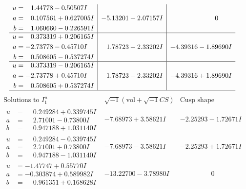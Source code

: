 \documentclass[1p]{elsarticle_modified}
\theoremstyle{definition}
\newcommand{\I}{\sqrt{-1}}
\begin{document}
$$\begin{array}{c|c|c}
\begin{aligned}
u &= \phantom{-}1.44778 - 0.50507 I \\
a &= \phantom{-}0.107561 + 0.627005 I \\
b &= \phantom{-}1.060660 - 0.226591 I\end{aligned}
 & -5.13201 + 2.07157 I & \phantom{-0.000000 } 0 \\ \hline\begin{aligned}
u &= \phantom{-}0.373319 + 0.206165 I \\
a &= -2.73778 - 0.45710 I \\
b &= \phantom{-}0.508605 - 0.537274 I\end{aligned}
 & \phantom{-}1.78723 + 2.33202 I & -4.39316 - 1.89690 I \\ \hline\begin{aligned}
u &= \phantom{-}0.373319 - 0.206165 I \\
a &= -2.73778 + 0.45710 I \\
b &= \phantom{-}0.508605 + 0.537274 I\end{aligned}
 & \phantom{-}1.78723 - 2.33202 I & -4.39316 + 1.89690 I\\
 \hline 
 \end{array}$$\newpage$$\begin{array}{c|c|c}  
\text{Solutions to }I^u_{1}& \I (\text{vol} + \sqrt{-1}CS) & \text{Cusp shape}\\
 \hline 
\begin{aligned}
u &= \phantom{-}0.249284 + 0.339745 I \\
a &= \phantom{-}2.71001 - 0.73800 I \\
b &= \phantom{-}0.947188 + 1.031140 I\end{aligned}
 & -7.68973 + 3.58621 I & -2.25293 - 1.72671 I \\ \hline\begin{aligned}
u &= \phantom{-}0.249284 - 0.339745 I \\
a &= \phantom{-}2.71001 + 0.73800 I \\
b &= \phantom{-}0.947188 - 1.031140 I\end{aligned}
 & -7.68973 - 3.58621 I & -2.25293 + 1.72671 I \\ \hline\begin{aligned}
u &= -1.47747 + 0.55770 I \\
a &= -0.303874 + 0.589982 I \\
b &= \phantom{-}0.961351 + 0.168628 I\end{aligned}
 & -13.22700 - 3.78980 I & \phantom{-0.000000 } 0 \\ \hline\begin{aligned}

\end{aligned}
\end{array}$$
\end{document}
